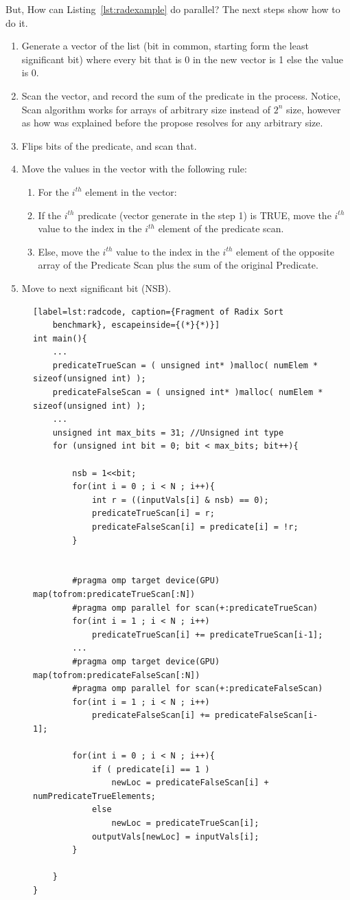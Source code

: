 \documentclass[Ingles]{ic-tese-v1}
\newcommand{\rlst}[1]{Listing~\ref{lst:#1}}
\begin{document}
But, How can \rlst{radexample} do parallel?
The next steps show how to do it.
\begin{enumerate}
\item Generate a vector of the list (bit in common, starting form the least significant bit)
where every bit that is 0 in the new vector is 1 else the value is 0.
\item Scan the vector, and record the sum of the predicate in the process. Notice, Scan
algorithm works for arrays of arbitrary size instead of $2^{n}$ size, however as how was
explained before the propose resolves for any arbitrary size.
\item Flips bits of the predicate, and scan that.
\item Move the values in the vector with the following rule:
\begin{enumerate}
\item For the $i^{th}$ element in the vector:
\item If the $i^{th}$ predicate (vector generate in the step 1) is TRUE, move the $i^{th}$
value to the index in the $i^{th}$ element of the predicate scan.
\item Else, move the $i^{th}$ value to the index in the $i^{th}$ element of the opposite array 
of the Predicate Scan plus the sum of the original Predicate.
\end{enumerate}
\item Move to next significant bit (NSB).
\end{enumerate}


\begin{figure}[t]
	\lstset{basicstyle=\scriptsize}
	\begin{lstlisting}[label=lst:radcode, caption={Fragment of Radix Sort
	benchmark}, escapeinside={(*}{*)}]
int main(){	
	...
	predicateTrueScan = ( unsigned int* )malloc( numElem * sizeof(unsigned int) );
	predicateFalseScan = ( unsigned int* )malloc( numElem * sizeof(unsigned int) );
	...
	unsigned int max_bits = 31; //Unsigned int type
	for (unsigned int bit = 0; bit < max_bits; bit++){
		
		nsb = 1<<bit;
		for(int i = 0 ; i < N ; i++){
			int r = ((inputVals[i] & nsb) == 0);
			predicateTrueScan[i] = r;
			predicateFalseScan[i] = predicate[i] = !r;
		}
		
		
		#pragma omp target device(GPU) map(tofrom:predicateTrueScan[:N])
		#pragma omp parallel for scan(+:predicateTrueScan)
		for(int i = 1 ; i < N ; i++)
			predicateTrueScan[i] += predicateTrueScan[i-1];
		...
		#pragma omp target device(GPU) map(tofrom:predicateFalseScan[:N])
		#pragma omp parallel for scan(+:predicateFalseScan)
		for(int i = 1 ; i < N ; i++)
			predicateFalseScan[i] += predicateFalseScan[i-1];
		
		for(int i = 0 ; i < N ; i++){
			if ( predicate[i] == 1 ) 
				newLoc = predicateFalseScan[i] + numPredicateTrueElements;
			else
				newLoc = predicateTrueScan[i];
			outputVals[newLoc] = inputVals[i];
		}
		
	}
}
	\end{lstlisting}
\end{figure}
\end{document}
